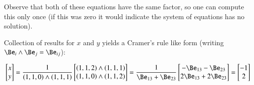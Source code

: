 Observe that both of these equations have the same factor, so
one can compute this only once (if this was zero it would
indicate the system of equations has no solution).

Collection of results for
$x$ and $y$ yields a Cramer's rule like form
(writing $\Be _i \wedge \Be _j = \Be _{ij}$):

\[
\begin{bmatrix}
x \\ y\end
{bmatrix}
=
\frac{1}{(1, 1, 0) \wedge (1, 1, 1)}
\begin{bmatrix}
(1, 1, 2) \wedge (1, 1, 1) \\
(1, 1, 0) \wedge (1, 1, 2)
\end{bmatrix}
=
\frac{1}{\Be_{13} + \Be_{23}}
\begin{bmatrix}
{-\Be_{13} - \Be_{23}} \\
{2\Be_{13} +2\Be_{23}} \\
\end{bmatrix}
=
\begin{bmatrix}
-1 \\ 2
\end{bmatrix}
\]

